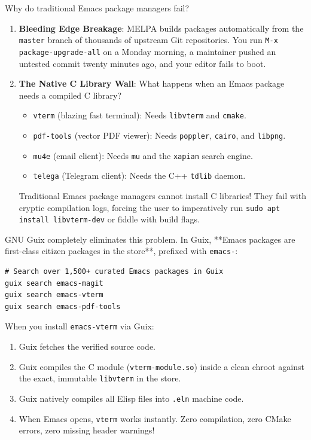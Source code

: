 \begin{tearsbox}
Why do traditional Emacs package managers fail?
\begin{enumerate}
  \item \textbf{Bleeding Edge Breakage}: MELPA builds packages automatically from the \texttt{master} branch of thousands of upstream Git repositories. You run \texttt{M-x package-upgrade-all} on a Monday morning, a maintainer pushed an untested commit twenty minutes ago, and your editor fails to boot.
  \item \textbf{The Native C Library Wall}: What happens when an Emacs package needs a compiled C library?
    \begin{itemize}
      \item \texttt{vterm} (blazing fast terminal): Needs \texttt{libvterm} and \texttt{cmake}.
      \item \texttt{pdf-tools} (vector PDF viewer): Needs \texttt{poppler}, \texttt{cairo}, and \texttt{libpng}.
      \item \texttt{mu4e} (email client): Needs \texttt{mu} and the \texttt{xapian} search engine.
      \item \texttt{telega} (Telegram client): Needs the C++ \texttt{tdlib} daemon.
    \end{itemize}
    Traditional Emacs package managers cannot install C libraries! They fail with cryptic compilation logs, forcing the user to imperatively run \texttt{sudo apt install libvterm-dev} or fiddle with build flags.
\end{enumerate}
\end{tearsbox}

GNU Guix completely eliminates this problem. In Guix, **Emacs packages are first-class citizen packages in the store**, prefixed with \texttt{emacs-}:

\begin{lstlisting}[style=guixcli]
# Search over 1,500+ curated Emacs packages in Guix
guix search emacs-magit
guix search emacs-vterm
guix search emacs-pdf-tools
\end{lstlisting}

When you install \texttt{emacs-vterm} via Guix:
\begin{enumerate}
  \item Guix fetches the verified source code.
  \item Guix compiles the C module (\texttt{vterm-module.so}) inside a clean chroot against the exact, immutable \texttt{libvterm} in the store.
  \item Guix natively compiles all Elisp files into \texttt{.eln} machine code.
  \item When Emacs opens, \texttt{vterm} works instantly. Zero compilation, zero CMake errors, zero missing header warnings!
\end{enumerate}

